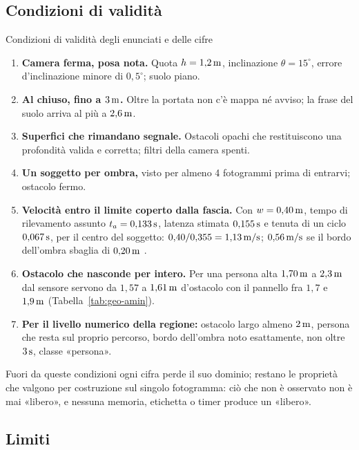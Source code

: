 \subsection{Condizioni di validità}\label{sec:lim-validita}

\begin{riquadro}{Condizioni di validità degli enunciati e delle cifre}
\begin{enumerate}[label=\arabic*.,itemsep=1pt]
\item \textbf{Camera ferma, posa nota.} Quota $h=1{,}2\,\mathrm{m}$, inclinazione $\theta=15^\circ$, errore d'inclinazione minore di $0{,}5^\circ$; suolo piano.
\item \textbf{Al chiuso, fino a $3\,\mathrm{m}$.} Oltre la portata non c'è mappa né avviso; la frase del suolo arriva al più a $2{,}6\,\mathrm{m}$.
\item \textbf{Superfici che rimandano segnale.} Ostacoli opachi che restituiscono una profondità valida e corretta; filtri della camera spenti.
\item \textbf{Un soggetto per ombra,} visto per almeno 4 fotogrammi prima di entrarvi; ostacolo fermo.
\item \textbf{Velocità entro il limite coperto dalla fascia.} Con $w=0{,}40\,\mathrm{m}$, tempo di rilevamento assunto $t_a=0{,}133\,\mathrm{s}$, latenza stimata $0{,}155\,\mathrm{s}$ e tenuta di un ciclo $0{,}067\,\mathrm{s}$, per il centro del soggetto: $0{,}40/0{,}355=1{,}13\,\mathrm{m/s}$; $0{,}56\,\mathrm{m/s}$ se il bordo dell'ombra sbaglia di $0{,}20\,\mathrm{m}$ .
\item \textbf{Ostacolo che nasconde per intero.} Per una persona alta $1{,}70\,\mathrm{m}$ a $2{,}3\,\mathrm{m}$ dal sensore servono da $1{,}57$ a $1{,}61\,\mathrm{m}$ d'ostacolo con il pannello fra $1{,}7$ e $1{,}9\,\mathrm{m}$ (Tabella~\ref{tab:geo-amin}).
\item \textbf{Per il livello numerico della regione:} ostacolo largo almeno $2\,\mathrm{m}$, persona che resta sul proprio percorso, bordo dell'ombra noto esattamente, non oltre $3\,\mathrm{s}$, classe «persona».
\end{enumerate}
Fuori da queste condizioni ogni cifra perde il suo dominio; restano le proprietà che valgono per costruzione sul singolo fotogramma: ciò che non è osservato non è mai «libero», e nessuna memoria, etichetta o timer produce un «libero».
\end{riquadro}

\subsection{Limiti}\label{sec:lim-limiti}

